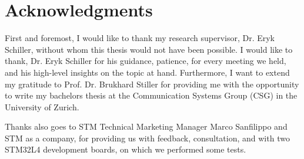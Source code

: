\chapter*{Acknowledgments}

First and foremost, I would like to thank my research supervisor, Dr. Eryk Schiller, without whom this thesis would not have been possible. I would like to thank, Dr. Eryk Schiller for his guidance, patience, for every meeting we held, and his high-level insights on the topic at hand. Furthermore, I want to extend my gratitude to Prof. Dr. Brukhard Stiller for providing me with the opportunity to write my bachelors thesis at the Communication Systems Group (CSG) in the University of Zurich.

Thanks also goes to STM Technical Marketing Manager Marco Sanfilippo and STM as a company, for providing us with feedback, consultation, and with two STM32L4 development boards, on which we performed some tests.

